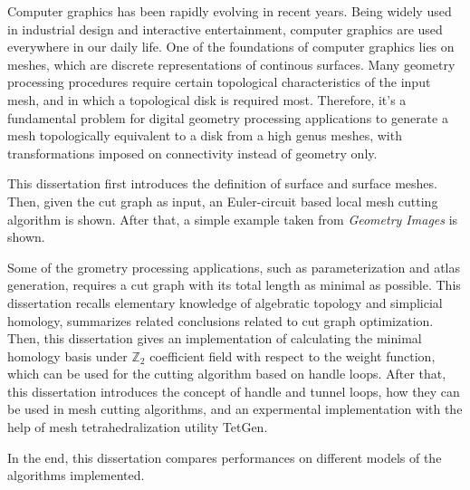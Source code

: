 \begin{abstract*}
  Computer graphics has been rapidly evolving in recent years. Being widely used in industrial design and interactive entertainment, computer graphics are used everywhere in our daily life. One of the foundations of computer graphics lies on meshes, which are discrete representations of continous surfaces. Many geometry processing procedures require certain topological characteristics of the input mesh, and in which a topological disk is required most. Therefore, it's a fundamental problem for digital geometry processing applications to generate a mesh topologically equivalent to a disk from a high genus meshes, with transformations imposed on connectivity instead of geometry only. 

  This dissertation first introduces the definition of surface and surface meshes. Then, given the cut graph as input, an Euler-circuit based local mesh cutting algorithm is shown. After that, a simple example taken from \textit{Geometry Images} is shown.

  Some of the grometry processing applications, such as parameterization and atlas generation, requires a cut graph with its total length as minimal as possible. This dissertation recalls elementary knowledge of algebratic topology and simplicial homology, summarizes related conclusions related to cut graph optimization. Then, this dissertation gives an implementation of calculating the minimal homology basis under $ \mathbb{Z}_2 $ coefficient field with respect to the weight function, which can be used for the cutting algorithm based on handle loops. After that, this dissertation introduces the concept of handle and tunnel loops, how they can be used in mesh cutting algorithms, and an expermental implementation with the help of mesh tetrahedralization utility TetGen.

  In the end, this dissertation compares performances on different models of the algorithms implemented.


\end{abstract*}
